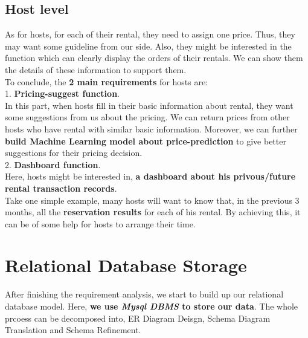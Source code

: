 \documentclass{article}
\begin{document}
	\subsection{Host level}
	As for hosts, for each of their rental, they need to assign one price. Thus, they may want some guideline from our side. Also, they might be interested in the function which can clearly display the orders of their rentals. We can show them the details of these information to support them.
	\vspace{3pt}
	\\
	To conclude, the \textbf{2 main requirements} for hosts are:
	\vspace{3pt}
	\\
	1. \textbf{Pricing-suggest function}.
	\\
	In this part, when hosts fill in their basic information about rental, they want some suggestions from us about the pricing. We can return prices from other hosts who have rental with similar basic information. Moreover, we can further \textbf{build Machine Learning model about price-prediction} to give better suggestions for their pricing decision.
	\vspace{3pt}
	\\
	2. \textbf{Dashboard function}.
	\\
	Here, hosts might be interested in, \textbf{a dashboard about his privous/future rental transaction records}. 
	\\
	Take one simple example, many hosts will want to know that, in the previous 3 months, all the \textbf{reservation results} for each of his rental. By achieving this, it can be of some help for hosts to arrange their time.
	\section{Relational Database Storage}
	After finishing the requirement analysis, we start to build up our relational database model. Here, \textbf{we use \textit{Mysql DBMS} to store our data}. The whole prcoess can be decomposed into, ER Diagram Deisgn, Schema Diagram Translation and Schema Refinement.
\end{document}
